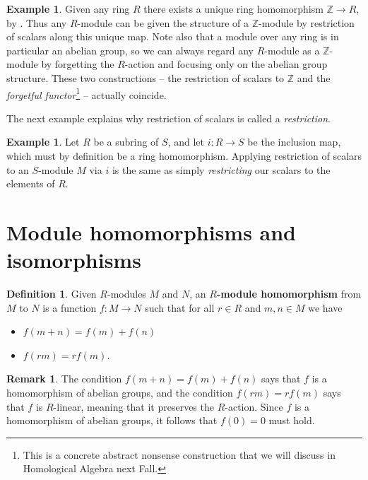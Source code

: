 \documentclass[12pt]{report}
\numberwithin{equation}{section}
\numberwithin{theorem}{chapter}
\theoremstyle{definition}
\newtheorem{definition}[theorem]{Definition}
\newtheorem{example}[theorem]{Example}
\newtheorem*{basic properties}{Basic Properties}
\newtheorem*{Important Remark}{Important Remark}
\newtheorem{remark}[theorem]{Remark}
\newcommand{\df}[1]{{\bf #1}\index{#1}}
\newcommand{\Z}{\mathbb{Z}}
\begin{document}
\begin{example}
Given any ring $R$ there exists a unique ring homomorphism $\Z \to R$, by . Thus any $R$-module can be given the structure of a $\Z$-module by restriction of scalars along this unique map. Note also that a module over any ring is in particular an abelian group, so we can always regard any $R$-module as a $\Z$-module by forgetting the $R$-action and focusing only on the abelian group structure. These two constructions -- the restriction of scalars to $\Z$ and the \emph{forgetful functor}\footnote{This is a concrete abstract nonsense construction that we will discuss in Homological Algebra next Fall.} -- actually coincide.
\end{example}

The next example explains why restriction of scalars is called a \emph{restriction}.

\begin{example}
	Let $R$ be a subring of $S$, and let $i\!: R \to S$ be the inclusion map, which must by definition be a ring homomorphism. Applying restriction of scalars to an $S$-module $M$ via $i$ is the same as simply \emph{restricting} our scalars to the elements of $R$.
\end{example}





\section{Module homomorphisms and isomorphisms}


\begin{definition}
	Given $R$-modules $M$ and $N$, an \df{$R$-module homomorphism} from $M$ to $N$ is a function $f\!: M \to N$ such that for all $r \in R$ and $m,n \in M$ we have
\begin{itemize}
\item $f(m+n)=f(m)+f(n)$
\item $f(rm) = rf(m)$.
\end{itemize}
\end{definition}


\begin{remark}
	The condition $f(m+n)=f(m)+f(n)$ says that $f$ is a homomorphism of abelian groups, and the condition $f(rm) = rf(m)$ says that $f$ is $R$-linear, meaning that it preserves the $R$-action. Since $f$ is a homomorphism of abelian groups, it follows that $f(0) = 0$ must hold.
\end{remark}
\end{document}
